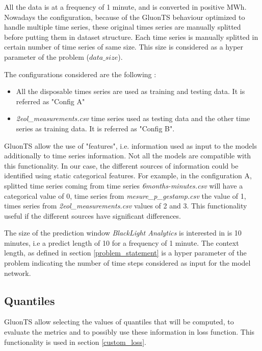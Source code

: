 All the data is at a frequency of 1 minute, and is converted in positive MWh. 
Nowadays the configuration, because of the GluonTS behaviour optimized to handle multiple time series, these original times series are manually splitted before putting them in dataset structure.
Each time series is manually splitted in certain number of time series of same size. This size is considered as a hyper parameter of the problem ($data\_size$). 

The configurations considered are the following :

\begin{itemize}
    \item All the disposable times series are used as training and testing data. It is referred as "Config A"
    \item \textit{2eol\_measurements.csv} time series used as testing data and the other time series as training data. It is referred as "Config B".
\end{itemize}

GluonTS allow the use of "features", i.e. information used as input to the models additionally to time series information. Not all the models are compatible with this functionality. 
In our case, the different sources of information could be identified using static categorical features. For example, in the configuration A, splitted time series coming from time series \textit{6months-minutes.csv} will have a categorical value of 0, time series from \textit{mesure\_p\_gestamp.csv} the value of 1, times series from \textit{2eol\_measurements.csv} values of 2 and 3. This functionality useful if the different sources have significant differences.

The size of the prediction window  \textit{BlackLight Analytics} is interested in is 10 minutes, i.e a predict length of 10  for a frequency of 1 minute. The context length, as defined in section \ref{problem_statement} is a hyper parameter of the problem indicating the number of time steps considered as input for the model network.



\subsection{Quantiles} \label{goal}

GluonTS allow selecting the values of quantiles that will be computed, to evaluate the metrics and to possibly use these information in loss function.
This functionality is used in section \ref{custom_loss}.

